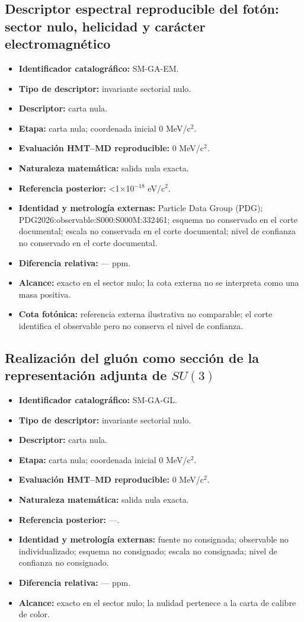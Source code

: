 \subsection{Descriptor espectral reproducible del fotón: sector nulo, helicidad y carácter electromagnético}
\begin{itemize}
\item \textbf{Identificador catalográfico:} SM-GA-EM.
\item \textbf{Tipo de descriptor:} invariante sectorial nulo.
\item \textbf{Descriptor:} carta nula.
\item \textbf{Etapa:} carta nula; coordenada inicial 0 MeV/c\({}^{2}\).
\item \textbf{Evaluación HMT--MD reproducible:} 0 MeV/c\({}^{2}\).
\item \textbf{Naturaleza matemática:} salida nula exacta.
\item \textbf{Referencia posterior:} <1×10\({}^{-18}\) eV/c\({}^{2}\).
\item \textbf{Identidad y metrología externas:} Particle Data Group (PDG); PDG2026:\allowbreak{}observable:\allowbreak{}S000:\allowbreak{}S000M:\allowbreak{}332461; esquema no conservado en el corte documental; escala no conservada en el corte documental; nivel de confianza no conservado en el corte documental.
\item \textbf{Diferencia relativa:} --- ppm.
\item \textbf{Alcance:} exacto en el sector nulo; la cota externa no se interpreta como una masa positiva.
\item \textbf{Cota fotónica:} referencia externa ilustrativa no comparable; el corte identifica el observable pero no conserva el nivel de confianza.
\end{itemize}
\subsection{Realización del gluón como sección de la representación adjunta de \(SU(3)\)}
\begin{itemize}
\item \textbf{Identificador catalográfico:} SM-GA-GL.
\item \textbf{Tipo de descriptor:} invariante sectorial nulo.
\item \textbf{Descriptor:} carta nula.
\item \textbf{Etapa:} carta nula; coordenada inicial 0 MeV/c\({}^{2}\).
\item \textbf{Evaluación HMT--MD reproducible:} 0 MeV/c\({}^{2}\).
\item \textbf{Naturaleza matemática:} salida nula exacta.
\item \textbf{Referencia posterior:} ---.
\item \textbf{Identidad y metrología externas:} fuente no consignada; observable no individualizado; esquema no consignado; escala no consignada; nivel de confianza no consignado.
\item \textbf{Diferencia relativa:} --- ppm.
\item \textbf{Alcance:} exacto en el sector nulo; la nulidad pertenece a la carta de calibre de color.
\end{itemize}
